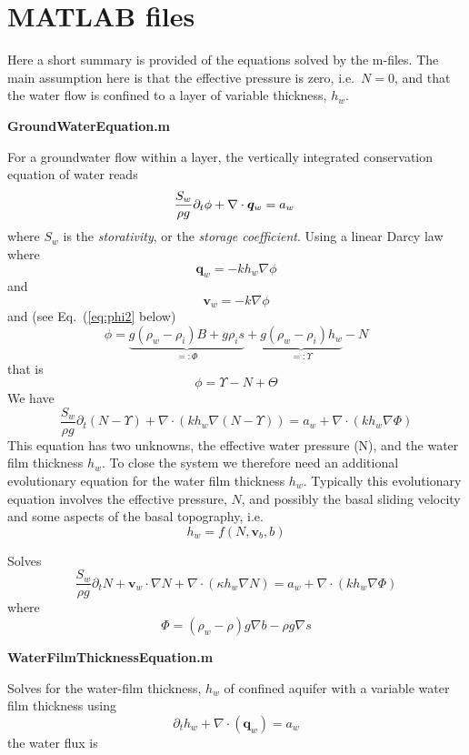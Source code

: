 \documentclass[10pt,a4paper]{article}
\begin{document}
\section{MATLAB files}

Here a short summary is
provided of the equations solved by the m-files. The main assumption
here is that the effective pressure is zero, i.e.\ $N=0$, and that the
water flow is confined to a layer of variable thickness, $h_w$.

\bigskip
\textbf{GroundWaterEquation.m}

For a groundwater flow within a layer, the vertically
integrated conservation equation of water reads
\begin{equation}
  \frac{S_w}{\rho g} \partial_t \phi + \nabla \cdot \bm{q}_w  = a_w \; 
\label{eq:hydphi}
\end{equation}
where $S_w$ is the \emph{storativity}, or the \emph{storage coefficient}. Using a linear Darcy law where
\[
\bm{q}_w = -k h_w \nabla \phi
\]
and 
\[
\bm{v}_w= - k \nabla \phi
\]
and (see Eq.~(\ref{eq:phi2} below) 
\[
  \phi = \underbrace{g (\rho_w-\rho_i) B + g \rho_i s}_{=:\Phi} +  \underbrace{g (\rho_w-\rho_i)  h_w}_{=:\Upsilon}  - N 
  \]
  that is
\[
\phi=\Upsilon - N +\Theta
\]
We have
\[
\frac{S_w}{\rho g}  \partial_t (N-\Upsilon)  + \nabla \cdot (k h_w \nabla (N-\Upsilon)) = a_w + \nabla \cdot (k h_w \nabla \Phi )
\]
This equation has two unknowns, the effective water pressure (N), and
the water film thickness $h_w$. To close the system we therefore need
an additional evolutionary equation for the water film thickness
$h_w$. Typically this evolutionary equation involves the effective
pressure, $N$, and possibly the basal sliding velocity and some aspects of the basal topography, i.e.\
\[
h_w=f(N,\bm{v}_b,b)
\]



Solves
\[
\frac{S_w}{\rho g}  \partial_t N +  \bm{v}_w \cdot \nabla N  + \nabla \cdot (\kappa h_w \nabla N) = a_w + \nabla \cdot (k h_w \nabla \Phi )
\]
where
\[
\Phi = (\rho_w-\rho) g \nabla b - \rho g \nabla s
\]




\medskip
\textbf{WaterFilmThicknessEquation.m }

Solves for the water-film thickness, $h_w$ of confined aquifer with a
variable water film thickness using
\[\partial_t h_w +   \nabla \cdot ( \bm{q}_w ) = a_w \]
the water flux is
\end{document}
